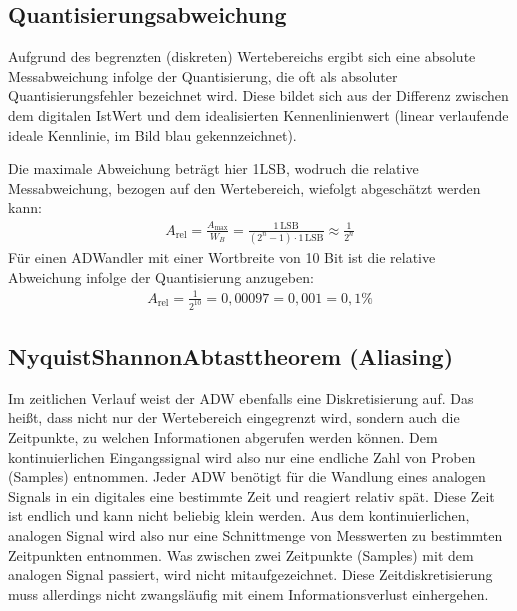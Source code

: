 \documentclass[letterpaper,10pt,english]{jupyterBook}
\begin{document}
\subsection{Quantisierungsabweichung}
\label{\detokenize{content/2_Digital:quantisierungsabweichung}}
\sphinxAtStartPar
Aufgrund des begrenzten (diskreten) Wertebereichs ergibt sich eine absolute Messabweichung infolge der Quantisierung, die oft als absoluter Quantisierungsfehler bezeichnet wird. Diese bildet sich aus der Differenz zwischen dem digitalen Ist\sphinxhyphen{}Wert und dem idealisierten Kennenlinienwert (linear verlaufende ideale Kennlinie, im Bild blau gekennzeichnet).

\sphinxAtStartPar
Die maximale Abweichung beträgt hier 1LSB, wodruch die relative Messabweichung, bezogen auf den Wertebereich, wiefolgt abgeschätzt werden kann:
\begin{equation*}
\begin{split}A_\mathrm{rel} = \frac{A_\mathrm{max}}{W_B} = \frac{1\,\mathrm{LSB}}{(2^n-1)\cdot 1\,\mathrm{LSB}} \approx \frac{1}{2^n}\end{split}
\end{equation*}
\sphinxAtStartPar
{} Für einen A\sphinxhyphen{}D\sphinxhyphen{}Wandler mit einer Wortbreite von 10 Bit ist die relative Abweichung infolge der Quantisierung anzugeben:
\begin{equation*}
\begin{split}A_\mathrm{rel} = \frac{1}{2^{10}} = 0,00097 = 0,001 = 0,1\% \end{split}
\end{equation*}

\subsection{Nyquist\sphinxhyphen{}Shannon\sphinxhyphen{}Abtasttheorem (Aliasing) }
\label{\detokenize{content/2_Digital:nyquist-shannon-abtasttheorem-aliasing-a-id-subsec-nyquist-shannon-abtasttheorem-a}}
\sphinxAtStartPar
Im zeitlichen Verlauf weist der ADW ebenfalls eine Diskretisierung auf.
Das heißt, dass nicht nur der Wertebereich eingegrenzt wird, sondern auch die Zeitpunkte, zu welchen Informationen abgerufen werden können. Dem kontinuierlichen Eingangssignal wird also nur eine endliche Zahl von Proben (Samples) entnommen.
Jeder ADW benötigt für die Wandlung eines analogen Signals in ein digitales eine bestimmte Zeit und reagiert relativ spät. Diese Zeit ist endlich und kann nicht beliebig klein werden. Aus dem kontinuierlichen, analogen Signal wird also nur eine Schnittmenge von Messwerten zu bestimmten Zeitpunkten entnommen. Was zwischen zwei Zeitpunkte (Samples) mit dem analogen Signal passiert, wird nicht mitaufgezeichnet. Diese Zeitdiskretisierung muss allerdings nicht zwangsläufig mit einem Informationsverlust einhergehen.
\end{document}
